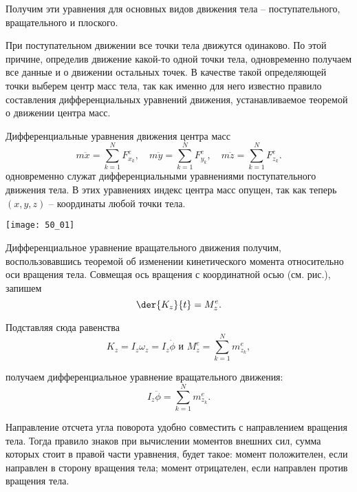 Получим эти уравнения для основных видов движения тела -- поступательного,
вращательного и плоского.

При поступательном движении все точки тела движутся одинаково. По этой причине,
определив движение какой-то одной точки тела, одновременно получаем все данные и
о движении остальных точек. В качестве такой определяющей точки выберем центр
масс тела, так как именно для него известно правило составления дифференциальных
уравнений движения, устанавливаемое теоремой о движении центра масс.

Дифференциальные уравнения движения центра масс
\[
    m\ddot{x} = \sum_{k=1}^N F^e_{x_k},
    \quad m\ddot{y} = \sum_{k=1}^N F^e_{y_k},
    \quad m\ddot{z} = \sum_{k=1}^N F^e_{z_k}.
\] 
одновременно служат дифференциальными уравнениями поступательного движения тела.
В этих уравнениях индекс центра масс опущен, так как теперь \( (x, y, z) \) --
координаты любой точки тела.

\begin{minipage}{.4\textwidth}
    \texttt{[image: 50\_01]}
\end{minipage}\hfill
\begin{minipage}{.55\textwidth}
Дифференциальное уравнение вращательного движения получим, воспользовавшись
теоремой об изменении кинетического момента относительно оси вращения тела.
Совмещая ось вращения с координатной осью (см. рис.), запишем
\[
    \der{K_z}{t} = M^e_z.
\]
 
Подставляя сюда равенства
\[
    K_z = I_z\omega_z = I_z\dot{\phi} \text{ и }
    M^e_z = \sum_{k=1}^N m^e_{z_k},
\]
\end{minipage}
получаем дифференциальное уравнение вращательного движения:
\[
    I_z\ddot{\phi} = \sum_{k=1}^N m^e_{z_k}.
\]
 
Направление отсчета угла поворота удобно совместить с направлением вращения
тела. Тогда правило знаков при вычислении моментов внешних сил, сумма которых
стоит в правой части уравнения, будет такое: момент положителен, если направлен
в сторону вращения тела; момент отрицателен, если направлен против вращения
тела.

\newpage
